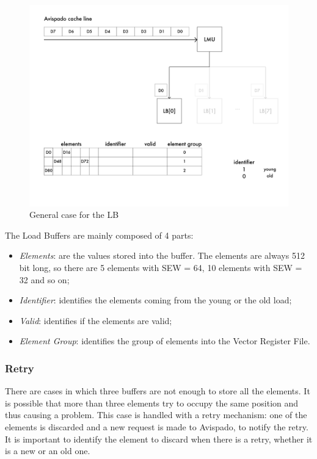\begin{figure}[H]
    \centering
    \includegraphics[scale = 0.6]{Chapter_2/img/cache-to-lb-genz-ex.png}
    \caption{General case for the LB}
    \label{lb-genz}
\end{figure}

The Load Buffers are mainly composed of 4 parts:
\begin{itemize}
    \item \emph{Elements}: are the values stored into the buffer. The elements are always 512 bit long, so there are 5 elements with SEW = 64, 10 elements with SEW = 32 and so on;
    
    \item \emph{Identifier}: identifies the elements coming from the young or the old load;
    
    \item \emph{Valid}: identifies if the elements are valid;
    
    \item \emph{Element Group}: identifies the group of elements into the Vector Register File. 
\end{itemize}

\subsubsection{Retry}
There are cases in which three buffers are not enough to store all the elements. It is possible that more than three elements try to occupy the same position and thus causing a problem.
This case is handled with a retry mechanism:
one of the elements is discarded and a new request is made to Avispado, to notify the retry.
It is important to identify the element to discard when there is a retry, whether it is a new or an old one.


